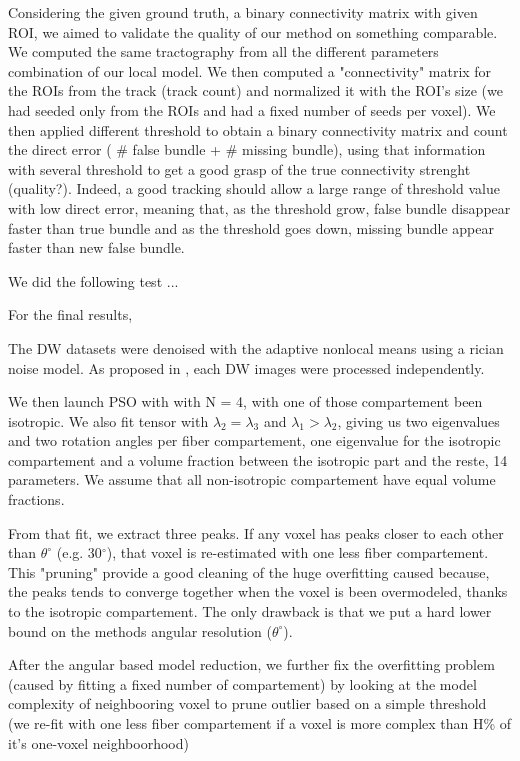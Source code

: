 \documentclass[9pt,conference,a4paper]{IEEEtran}
\begin{document}
Considering the given ground truth, a binary connectivity matrix with given ROI, we aimed to validate the quality of our method on something comparable. We computed the same tractography from all the different parameters combination of our local model. We then computed a "connectivity" matrix for the ROIs from the track (track count) and normalized it with the ROI's size (we had seeded only from the ROIs and had a fixed number of seeds per voxel). We then applied different threshold to obtain a binary connectivity matrix and count the direct error ( $\#$ false bundle + $\#$ missing bundle), using that information with several threshold to get a good grasp of the true connectivity strenght (quality?). Indeed, a good tracking should allow a large range of threshold value with low direct error, meaning that, as the threshold grow, false bundle disappear faster than true bundle and as the threshold goes down, missing bundle appear faster than new false bundle.

We did the following test ...

For the final results,

The DW datasets were denoised with the adaptive nonlocal means \cite{manjon-coupe:10} using a rician noise model. As proposed in \cite{descoteaux-wiest-daessle-etal:08}, each DW images were processed independently.

We then launch PSO with with N = 4, with one of those compartement been isotropic. We also fit tensor with $\lambda_2 = \lambda_3$ and $\lambda_1 > \lambda_2$, giving us two eigenvalues and two rotation angles per fiber compartement, one eigenvalue for the isotropic compartement and a volume fraction between the isotropic part and the reste, 14 parameters. We assume that all non-isotropic compartement have equal volume fractions.

From that fit, we extract three peaks. If any voxel has peaks closer to each other than $\theta^\circ$ (e.g. 30$^\circ$), that voxel is re-estimated with one less fiber compartement. This "pruning" provide a good cleaning of the huge overfitting caused because, the peaks tends to converge together when the voxel is been overmodeled, thanks to the isotropic compartement. The only drawback is that we put a hard lower bound on the methods angular resolution ($\theta^\circ$).

After the angular based model reduction, we further fix the overfitting problem (caused by fitting a fixed number of compartement) by looking at the model complexity of neighbooring voxel to prune outlier based on a simple threshold (we re-fit with one less fiber compartement if a voxel is more complex than H\% of it's one-voxel neighboorhood)
\end{document}
